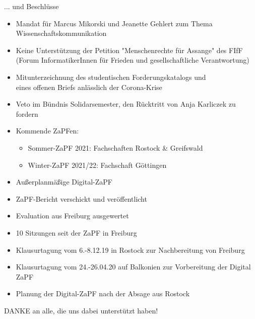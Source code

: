 \documentclass[compress, aspectratio=169]{beamer}
\begin{document}
\begin{frame}{... und Beschlüsse}
  \begin{itemize}
      \item Mandat für Marcus Mikorski und Jeanette Gehlert zum Thema Wissenschaftskommunikation
      \item Keine Unterstützung der Petition "Menschenrechte für Assange" des FIfF (Forum InformatikerInnen für Frieden und gesellschaftliche Verantwortung)
      \item Mitunterzeichnung des studentischen Forderungskatalogs und \\
      eines offenen Briefs anlässlich der Corona-Krise
      \item Veto im Bündnis Solidarsemester, den Rücktritt von Anja Karliczek zu fordern
      \item Kommende ZaPFen:
        \begin{itemize}
          \item Sommer-ZaPF 2021: Fachschaften Rostock \& Greifswald
          \item Winter-ZaPF 2021/22: Fachschaft Göttingen
        \end{itemize}
    \item Außerplanmäßige Digital-ZaPF
  \end{itemize}
\end{frame}

\begin{frame}
  \begin{itemize}
    \item ZaPF-Bericht verschickt und veröffentlicht
    \item Evaluation aus Freiburg ausgewertet
    \item 10 Sitzungen seit der ZaPF in Freiburg
    \item Klausurtagung vom 6.-8.12.19 in Rostock zur Nachbereitung von Freiburg
    \item Klausurtagung vom 24.-26.04.20 auf Balkonien zur Vorbereitung der Digital ZaPF
    \item Planung der Digital-ZaPF nach der Absage aus Rostock
  \end{itemize}
  \vspace{5mm}
  \begin{center}
    \Large DANKE an alle, die uns dabei unterstützt haben!
  \end{center}
\end{frame}

\end{document}
